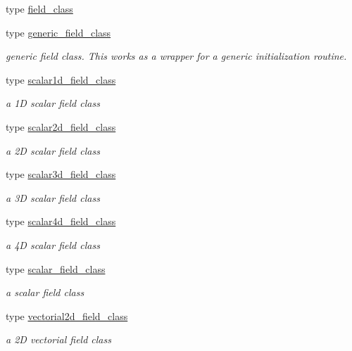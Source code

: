 \begin{DoxyCompactItemize}
\item 
type \mbox{\hyperlink{structfield__types__mod_1_1field__class}{field\+\_\+class}}
\item 
type \mbox{\hyperlink{structfield__types__mod_1_1generic__field__class}{generic\+\_\+field\+\_\+class}}
\begin{DoxyCompactList}\small\item\em generic field class. This works as a wrapper for a generic initialization routine. \end{DoxyCompactList}\item 
type \mbox{\hyperlink{structfield__types__mod_1_1scalar1d__field__class}{scalar1d\+\_\+field\+\_\+class}}
\begin{DoxyCompactList}\small\item\em a 1D scalar field class \end{DoxyCompactList}\item 
type \mbox{\hyperlink{structfield__types__mod_1_1scalar2d__field__class}{scalar2d\+\_\+field\+\_\+class}}
\begin{DoxyCompactList}\small\item\em a 2D scalar field class \end{DoxyCompactList}\item 
type \mbox{\hyperlink{structfield__types__mod_1_1scalar3d__field__class}{scalar3d\+\_\+field\+\_\+class}}
\begin{DoxyCompactList}\small\item\em a 3D scalar field class \end{DoxyCompactList}\item 
type \mbox{\hyperlink{structfield__types__mod_1_1scalar4d__field__class}{scalar4d\+\_\+field\+\_\+class}}
\begin{DoxyCompactList}\small\item\em a 4D scalar field class \end{DoxyCompactList}\item 
type \mbox{\hyperlink{structfield__types__mod_1_1scalar__field__class}{scalar\+\_\+field\+\_\+class}}
\begin{DoxyCompactList}\small\item\em a scalar field class \end{DoxyCompactList}\item 
type \mbox{\hyperlink{structfield__types__mod_1_1vectorial2d__field__class}{vectorial2d\+\_\+field\+\_\+class}}
\begin{DoxyCompactList}\small\item\em a 2D vectorial field class \end{DoxyCompactList}\item 

\end{DoxyCompactItemize}
